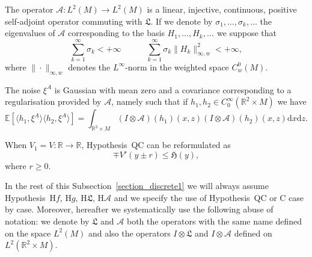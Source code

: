 \documentclass[a4paper,10pt]{article}
\newcommand{\mathd}{\mathrm{d}}
\begin{document}
{{\item[Hypothesis~H$\mathcal{A}$.] The operator $\mathcal{A} : L^2 (M)
\rightarrow L^2 (M)$ is a linear, injective, continuous, positive self-adjoint
operator commuting with $\mathfrak{L}$. If we denote by $\sigma_1, \ldots,
\sigma_k, \ldots$ the eigenvalues of $\mathcal{A}$ corresponding to the basis
$H_1, \ldots, H_k, \ldots_{}$ we suppose that
\[ \sum_{k = 1}^{\infty} \sigma_k < + \infty \hspace{3em} \sum_{k =
   1}^{\infty} \sigma_k \| H_k \|_{\infty, w}^2 < + \infty, \]
where $\| \cdot \|_{\infty, w}$ denotes the $L^{\infty}$-norm in the weighted
space $C^0_w (M)$.

\item[Hypothesis~H$\xi$.] The noise $\xi^A$ is Gaussian with mean zero and a
covariance corresponding to a regularisation provided by $\mathcal{A}$, namely
such that if $h_1, h_2 \in C^{\infty}_0 (\mathbb{R}^2 \times M)$ we have
\[ \mathbb{E} [\langle h_1, \xi^A \rangle \langle h_2^{}, \xi^A \rangle] =
   \int_{\mathbb{R}^2 \times M} (I \otimes \mathcal{A}) (h_1) (x, z) (I
   \otimes \mathcal{A}) (h_2) (x, z) \mathd x \mathd z. \]}}

\begin{remark}
  When $V_1 = V : \mathbb{R} \rightarrow \mathbb{R}$, Hypothesis~QC can be
  reformulated as
  \[ \mp V' (y \pm r) \leqslant \mathfrak{H} (y), \]
  where $r \geqslant 0$.
\end{remark}

In the rest of this Subsection~\ref{section_discrete1} we will always assume
Hypothesis~H$f$, H$g$, H$\mathfrak{L}$, H$\mathcal{A}$ and we specify the use
of Hypothesis~QC or C case by case. Moreover, hereafter we systematically use
the following abuse of notation: we denote by $\mathfrak{L}$ and $\mathcal{A}$
both the operators with the same name defined on the space $L^2 (M)$ and also
the operators $I \otimes \mathfrak{L}$ and $I \otimes \mathcal{A}$ defined on
$L^2 (\mathbb{R}^2 \times M)$.

\
\end{document}
